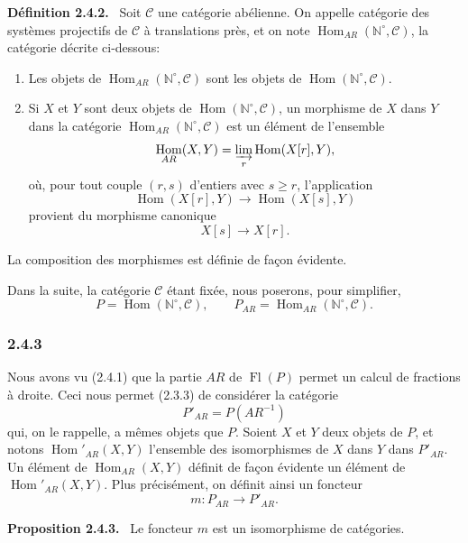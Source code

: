 \documentclass[11pt]{article}
\providecommand{\NN}{\mathbb{N}}
\newenvironment{statement}[1]{\par\medskip\noindent\textbf{#1.}\ }{\par\medskip}
\DeclareMathOperator{\Hom}{Hom}
\providecommand{\Hom}{\operatorname{Hom}}
\providecommand{\Fl}{\operatorname{Fl}}
\providecommand{\NN}{\mathbb N}
\providecommand{\cC}{\mathcal C}
\begin{document}
\begin{statement}{Définition 2.4.2}
Soit $\cC$ une catégorie abélienne. On appelle catégorie des systèmes projectifs de $\cC$ à translations près, et on note $\Hom_{AR}(\NN^\circ,\cC)$, la catégorie décrite ci-dessous:
\begin{enumerate}[label=(\roman*)]
\item Les objets de $\Hom_{AR}(\NN^\circ,\cC)$ sont les objets de $\Hom(\NN^\circ,\cC)$.
\item Si $X$ et $Y$ sont deux objets de $\Hom(\NN^\circ,\cC)$, un morphisme de $X$ dans $Y$ dans la catégorie $\Hom_{AR}(\NN^\circ,\cC)$ est un élément de l'ensemble
\[
\Hom_{AR}(X,Y)=\varinjlim_r\Hom(X[r],Y),
\]
où, pour tout couple $(r,s)$ d'entiers avec $s\ge r$, l'application
\[
\Hom(X[r],Y)\longrightarrow\Hom(X[s],Y)
\]
provient du morphisme canonique
\[
X[s]\longrightarrow X[r].
\]
\end{enumerate}
La composition des morphismes est définie de façon évidente.
\end{statement}
Dans la suite, la catégorie $\cC$ étant fixée, nous poserons, pour simplifier,
\[
P=\Hom(\NN^\circ,\cC),\qquad P_{AR}=\Hom_{AR}(\NN^\circ,\cC).
\]

\subsubsection*{2.4.3}
Nous avons vu (2.4.1) que la partie $AR$ de $\Fl(P)$ permet un calcul de fractions à droite. Ceci nous permet (2.3.3) de considérer la catégorie
\[
P'_{AR}=P(AR^{-1})
\]
qui, on le rappelle, a mêmes objets que $P$. Soient $X$ et $Y$ deux objets de $P$, et notons $\Hom'_{AR}(X,Y)$ l'ensemble des isomorphismes de $X$ dans $Y$ dans $P'_{AR}$. Un élément de $\Hom_{AR}(X,Y)$ définit de façon évidente un élément de $\Hom'_{AR}(X,Y)$. Plus précisément, on définit ainsi un foncteur
\[
m:P_{AR}\longrightarrow P'_{AR}.
\]

\begin{statement}{Proposition 2.4.3}
Le foncteur $m$ est un isomorphisme de catégories.
\end{statement}
\end{document}
